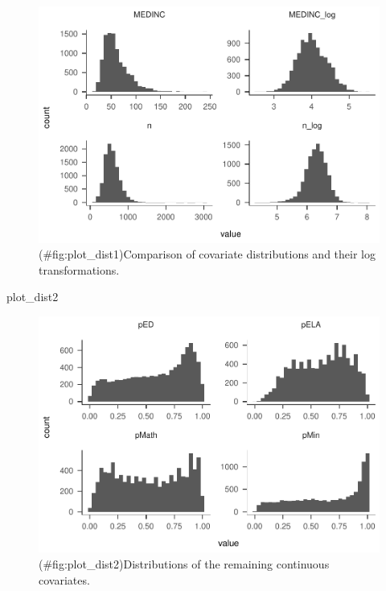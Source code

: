 \documentclass[man]{apa6}
\newenvironment{Shaded}{\begin{snugshade}}{\end{snugshade}}
\newcommand{\NormalTok}[1]{#1}
\begin{document}
\begin{figure}
\centering
\includegraphics{GenSamp_Paper_Code_files/figure-latex/plot_dist1-1.pdf}
\caption{(\#fig:plot\_dist1)Comparison of covariate distributions and their log transformations.}
\end{figure}

\begin{Shaded}
\begin{Highlighting}[]
\NormalTok{plot_dist2}
\end{Highlighting}
\end{Shaded}

\begin{figure}
\centering
\includegraphics{GenSamp_Paper_Code_files/figure-latex/plot_dist2-1.pdf}
\caption{(\#fig:plot\_dist2)Distributions of the remaining continuous covariates.}
\end{figure}
\end{document}
